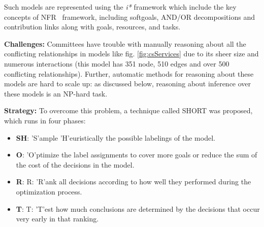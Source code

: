 \documentclass[sigconf,anonymous,review]{acmart}
\begin{document}
Such models are represented using the \textit{i*} framework \cite{yu97a} which include the key concepts of NFR~\cite{mylopoulos92.nfr} framework, including softgoals, AND/OR decompositions and contribution links along with goals, resources, and tasks. 


\noindent\textbf{Challenges: } Committees have trouble with manually reasoning about all the conflicting relationships in models like fig. \ref{fig:csServices} due to its sheer size and numerous interactions (this model has 351 node, 510 edges and over 500 conflicting relationships). Further, automatic methods for reasoning about these models are hard to scale up: as discussed below, reasoning about inference over these models is an NP-hard task. 

\noindent\textbf{Strategy:} To overcome this problem, a technique called SHORT was proposed, which runs in four phases:
\begin{itemize}
    \item{\textbf{SH}: 'S'ample 'H'euristically the possible labelings of the model.}
    \item{\textbf{O}: 'O'ptimize the label assignments to cover more goals or reduce the sum of the cost of the decisions in the model.}
    \item{\textbf{R}: R: 'R'ank all decisions according to how well they performed during the optimization process.}
    \item{\textbf{T}: T: 'T'est how much conclusions are determined by the decisions that occur very early in that ranking.}
\end{itemize}
\end{document}
